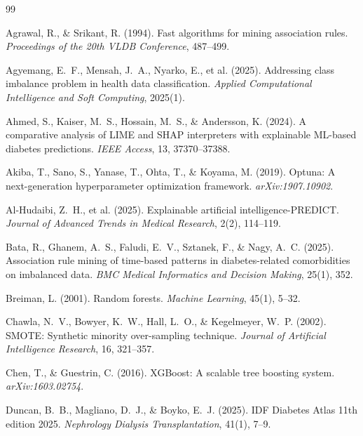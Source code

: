 ﻿\documentclass[12pt,a4paper]{article}
\begin{document}

\begin{thebibliography}{99}

Agrawal, R., \& Srikant, R. (1994).
Fast algorithms for mining association rules.
\textit{Proceedings of the 20th VLDB Conference}, 487--499.

Agyemang, E.~F., Mensah, J.~A., Nyarko, E., et al. (2025).
Addressing class imbalance problem in health data classification.
\textit{Applied Computational Intelligence and Soft Computing}, 2025(1).

Ahmed, S., Kaiser, M.~S., Hossain, M.~S., \& Andersson, K. (2024).
A comparative analysis of LIME and SHAP interpreters with explainable ML-based diabetes predictions.
\textit{IEEE Access}, 13, 37370--37388.

Akiba, T., Sano, S., Yanase, T., Ohta, T., \& Koyama, M. (2019).
Optuna: A next-generation hyperparameter optimization framework.
\textit{arXiv:1907.10902}.

Al-Hudaibi, Z.~H., et al. (2025).
Explainable artificial intelligence-PREDICT.
\textit{Journal of Advanced Trends in Medical Research}, 2(2), 114--119.

Bata, R., Ghanem, A.~S., Faludi, E.~V., Sztanek, F., \& Nagy, A.~C. (2025).
Association rule mining of time-based patterns in diabetes-related comorbidities on imbalanced data.
\textit{BMC Medical Informatics and Decision Making}, 25(1), 352.

Breiman, L. (2001).
Random forests.
\textit{Machine Learning}, 45(1), 5--32.

Chawla, N.~V., Bowyer, K.~W., Hall, L.~O., \& Kegelmeyer, W.~P. (2002).
SMOTE: Synthetic minority over-sampling technique.
\textit{Journal of Artificial Intelligence Research}, 16, 321--357.

Chen, T., \& Guestrin, C. (2016).
XGBoost: A scalable tree boosting system.
\textit{arXiv:1603.02754}.

Duncan, B.~B., Magliano, D.~J., \& Boyko, E.~J. (2025).
IDF Diabetes Atlas 11th edition 2025.
\textit{Nephrology Dialysis Transplantation}, 41(1), 7--9.


\end{thebibliography}
\end{document}
